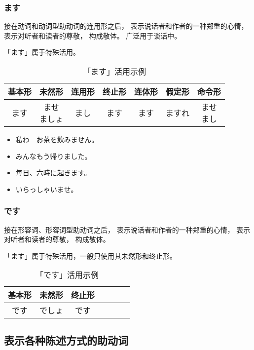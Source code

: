 \subsubsection{ます}%

接在动词和动词型助动词的连用形之后，
表示说话者和作者的一种郑重的心情，
表示对听者和读者的尊敬，
构成敬体。
广泛用于谈话中。

「ます」属于特殊活用。

\begin{table}[h]
  \centering
  \caption{「ます」活用示例}
  \begin{tabular}{c c c c c c c}
    基本形 & 未然形 & 连用形 & 终止形 & 连体形 & 假定形 & 命令形 \\
    \hline
    ます & \makecell{ませ \\ ましょ} & まし & ます & ます & ますれ & \makecell{ませ \\ まし} \\
  \end{tabular}
\end{table}

\begin{itemize}
  \item 私わ　お茶を飲みません。
  \item みんなもう帰りました。
  \item 毎日、六時に起きます。
  \item いらっしゃいませ。
\end{itemize}


\subsubsection{です}%

接在形容词、形容词型助动词之后，
表示说话者和作者的一种郑重的心情，
表示对听者和读者的尊敬，
构成敬体。

「ます」属于特殊活用，一般只使用其未然形和终止形。

\begin{table}[h]
  \centering
  \caption{「です」活用示例}
  \begin{tabular}{c c c c c c c}
    基本形 & 未然形 & 终止形 \\
    \hline
    です & でしょ & です \\
  \end{tabular}
\end{table}



\subsection{表示各种陈述方式的助动词}%

